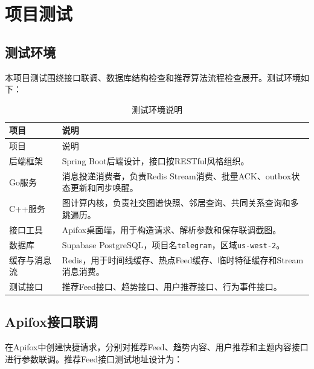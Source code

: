 
\chapter{项目测试}

\section{测试环境}

本项目测试围绕接口联调、数据库结构检查和推荐算法流程检查展开。测试环境如下：

\begin{longtable}{L{0.28\textwidth}L{0.62\textwidth}}
  \caption{测试环境说明}                                                        \\
  \toprule
  项目     & 说明                                                             \\
  \midrule
  \endfirsthead
  \toprule
  项目     & 说明                                                             \\
  \midrule
  \endhead
  后端框架   & Spring Boot后端设计，接口按RESTful风格组织。                                \\
  Go服务   & 消息投递消费者，负责Redis Stream消费、批量ACK、outbox状态更新和同步唤醒。                \\
  C++服务  & 图计算内核，负责社交图谱快照、邻居查询、共同关系查询和多跳遍历。                               \\
  接口工具   & Apifox桌面端，用于构造请求、解析参数和保存联调截图。                                  \\
  数据库    & Supabase PostgreSQL，项目名\texttt{telegram}，区域\texttt{us-west-2}。 \\
  缓存与消息流 & Redis，用于时间线缓存、热点Feed缓存、临时特征缓存和Stream消息消费。                      \\
  测试接口   & 推荐Feed接口、趋势接口、用户推荐接口、行为事件接口。                                   \\
  \bottomrule
\end{longtable}

\section{Apifox接口联调}

在Apifox中创建快捷请求，分别对推荐Feed、趋势内容、用户推荐和主题内容接口进行参数联调。推荐Feed接口测试地址设计为：

